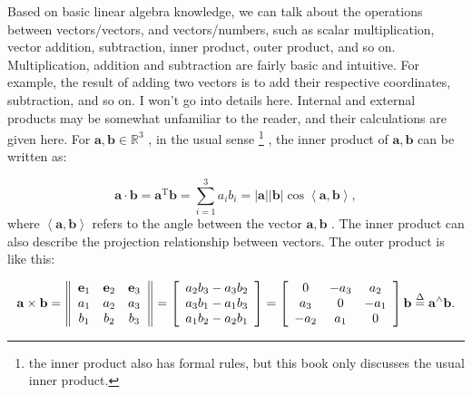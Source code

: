 Based on basic linear algebra knowledge, we can talk about the operations between vectors/vectors, and vectors/numbers, such as scalar multiplication, vector addition, subtraction, inner product, outer product, and so on. Multiplication, addition and subtraction are fairly basic and intuitive. For example, the result of adding two vectors is to add their respective coordinates, subtraction, and so on. I won't go into details here. Internal and external products may be somewhat unfamiliar to the reader, and their calculations are given here. For $ \mathbf {a}, \mathbf {b} \in  \mathbb {R}^ 3 $ , in the usual sense \footnote {the inner product also has formal rules, but this book only discusses the usual inner product.} , the inner product of $\mathbf{a}, \mathbf{b}$ can be written as:

\begin{equation}
\mathbf{a} \cdot \mathbf{b} = { \mathbf{a}^\mathrm{T}}\mathbf{b} = \sum\limits_{i = 1}^3 {{a_i}{b_i}}  = \left| \mathbf{a} \right|\left| \mathbf{b} \right|\cos \left\langle {\mathbf{a},\mathbf{b}} \right\rangle ,
\end{equation}
where $ \left \langle { \mathbf {a}, \mathbf {b}} \right \rangle $ refers to the angle between the vector $ \mathbf {a}, \mathbf {b} $ . The inner product can also describe the projection relationship between vectors. The outer product is like this:

\begin{equation}
\label{eq:cross}
\mathbf{a} \times \mathbf{b} = \left\| {\begin{array}{*{20}{c}}
	\mathbf{e}_1 & \mathbf{e}_2 & \mathbf{e}_3 \\
	{{a_1}}&{{a_2}}&{{a_3}}\\
	{{b_1}}&{{b_2}}&{{b_3}}
	\end{array}} \right\| = \left[ \begin{array}{l}
{a_2}{b_3} - {a_3}{b_2}\\
{a_3}{b_1} - {a_1}{b_3}\\
{a_1}{b_2} - {a_2}{b_1}
\end{array} \right] = \left[ {\begin{array}{*{20}{c}}
	0&{ - {a_3}}&{{a_2}}\\
	{{a_3}}&0&{-{a_1}}\\  
	{-{a_2}}&{{a_1}}&0  
	\end{array}} \right] \mathbf{b} \buildrel \Delta \over = { \mathbf{a}^ \wedge } \mathbf{b}.
\end{equation}

